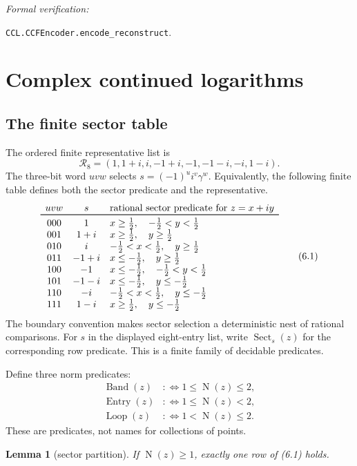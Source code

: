 \documentclass[10pt]{article}
\newtheorem{lemma}[theorem]{Lemma}
\theoremstyle{definition}
\theoremstyle{remark}
\newcommand{\Norm}{\operatorname{N}}
\newcommand{\leanref}[1]{\par\smallskip\noindent
  \emph{Formal verification:}\par\nobreak
  {\raggedright\nolinkurl{#1}.\par}}
\begin{document}
\leanref{CCL.CCFEncoder.encode_reconstruct}

\section{Complex continued logarithms}

\subsection{The finite sector table}

The ordered finite representative list is
\[
 \mathcal R_8=(1,1+i,i,-1+i,-1,-1-i,-i,1-i).
\]
The three-bit word $uvw$ selects $s=(-1)^u i^v\gamma^w$.  Equivalently, the following finite table defines both the sector predicate and the representative.
\[
\begin{array}{ccl}
uvw&s&\text{rational sector predicate for }z=x+iy\\ \toprule
000&1&x\ge\tfrac12,\quad -\tfrac12<y<\tfrac12\\
001&1+i&x\ge\tfrac12,\quad y\ge\tfrac12\\
010&i&-\tfrac12<x<\tfrac12,\quad y\ge\tfrac12\\
011&-1+i&x\le-\tfrac12,\quad y\ge\tfrac12\\
100&-1&x\le-\tfrac12,\quad -\tfrac12<y<\tfrac12\\
101&-1-i&x\le-\tfrac12,\quad y\le-\tfrac12\\
110&-i&-\tfrac12<x<\tfrac12,\quad y\le-\tfrac12\\
111&1-i&x\ge\tfrac12,\quad y\le-\tfrac12
\end{array}
\tag{6.1}
\]
The boundary convention makes sector selection a deterministic nest of rational comparisons.  For $s$ in the displayed eight-entry list, write $\operatorname{Sect}_s(z)$ for the corresponding row predicate.  This is a finite family of decidable predicates.

Define three norm predicates:
\[
 \begin{aligned}
 \operatorname{Band}(z)&:\Longleftrightarrow 1\le\Norm(z)\le2,\\
 \operatorname{Entry}(z)&:\Longleftrightarrow 1\le\Norm(z)<2,\\
 \operatorname{Loop}(z)&:\Longleftrightarrow 1<\Norm(z)\le2.
 \end{aligned}
\]
These are predicates, not names for collections of points.

\begin{lemma}[sector partition]\label{lem:sector-partition}
If $\Norm(z)\ge1$, exactly one row of (6.1) holds.
\end{lemma}
\end{document}
